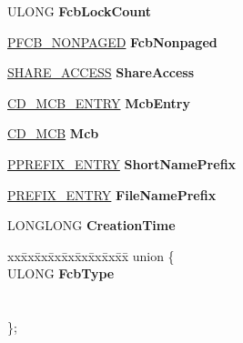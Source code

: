 \begin{DoxyCompactItemize}
\mbox{\label{struct___f_c_b_aa3767137e50cef35e88cb500c5c5cf8e}} 
U\+L\+O\+NG {\bfseries Fcb\+Lock\+Count}
\item 
\mbox{\label{struct___f_c_b_afb8e07d46c750367b3dda46a379af586}} 
\hyperlink{struct___f_c_b___n_o_n_p_a_g_e_d}{P\+F\+C\+B\+\_\+\+N\+O\+N\+P\+A\+G\+ED} {\bfseries Fcb\+Nonpaged}
\item 
\mbox{\label{struct___f_c_b_a3f96804981cb054560a216f538f9db2e}} 
\hyperlink{struct___s_h_a_r_e___a_c_c_e_s_s}{S\+H\+A\+R\+E\+\_\+\+A\+C\+C\+E\+SS} {\bfseries Share\+Access}
\item 
\mbox{\label{struct___f_c_b_ab4a615cbb06187c4ac47af3072bae196}} 
\hyperlink{struct___c_d___m_c_b___e_n_t_r_y}{C\+D\+\_\+\+M\+C\+B\+\_\+\+E\+N\+T\+RY} {\bfseries Mcb\+Entry}
\item 
\mbox{\label{struct___f_c_b_a400d21f4113cf4d3da65983fd0593c67}} 
\hyperlink{struct___c_d___m_c_b}{C\+D\+\_\+\+M\+CB} {\bfseries Mcb}
\item 
\mbox{\label{struct___f_c_b_ab6b1ce5498904269bfdbc8d92d78149a}} 
\hyperlink{struct___p_r_e_f_i_x___e_n_t_r_y}{P\+P\+R\+E\+F\+I\+X\+\_\+\+E\+N\+T\+RY} {\bfseries Short\+Name\+Prefix}
\item 
\mbox{\label{struct___f_c_b_a05314476f428a6807449ddb70a9aa3d1}} 
\hyperlink{struct___p_r_e_f_i_x___e_n_t_r_y}{P\+R\+E\+F\+I\+X\+\_\+\+E\+N\+T\+RY} {\bfseries File\+Name\+Prefix}
\item 
\mbox{\label{struct___f_c_b_a9e1e51e1a8b5a740bcb706b0b460fea2}} 
L\+O\+N\+G\+L\+O\+NG {\bfseries Creation\+Time}
\item 
\mbox{\label{struct___f_c_b_a00069f8b1efa86f17d8b95f66301396d}} 
\begin{tabbing}
xx\=xx\=xx\=xx\=xx\=xx\=xx\=xx\=xx\=\kill
union \{\\
\>ULONG {\bfseries FcbType}\\
\\
\\
\}; \\


\end{tabbing}
\end{DoxyCompactItemize}
